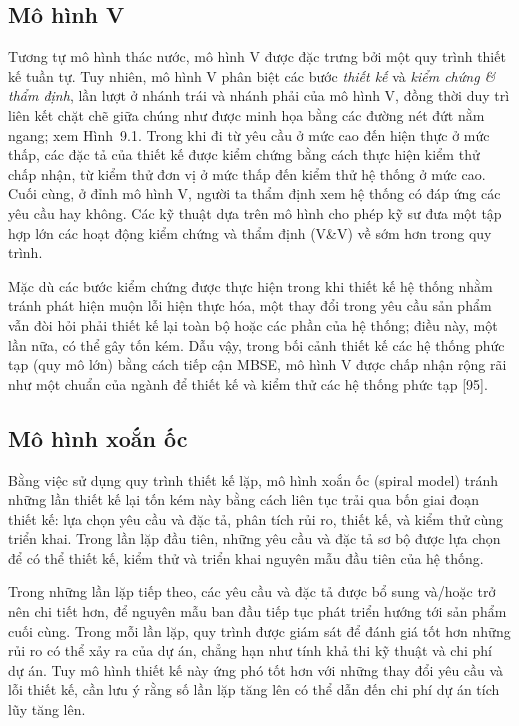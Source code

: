 \subsection{Mô hình V}
Tương tự mô hình thác nước, mô hình V được đặc trưng bởi một quy trình thiết kế tuần tự. Tuy nhiên, mô hình V phân biệt các bước \emph{thiết kế} và \emph{kiểm chứng \& thẩm định}, lần lượt ở nhánh trái và nhánh phải của mô hình V, đồng thời duy trì liên kết chặt chẽ giữa chúng như được minh họa bằng các đường nét đứt nằm ngang; xem Hình~9.1. Trong khi đi từ yêu cầu ở mức cao đến hiện thực ở mức thấp, các đặc tả của thiết kế được kiểm chứng bằng cách thực hiện kiểm thử chấp nhận, từ kiểm thử đơn vị ở mức thấp đến kiểm thử hệ thống ở mức cao. Cuối cùng, ở đỉnh mô hình V, người ta thẩm định xem hệ thống có đáp ứng các yêu cầu hay không. Các kỹ thuật dựa trên mô hình cho phép kỹ sư đưa một tập hợp lớn các hoạt động kiểm chứng và thẩm định (V\&V) về sớm hơn trong quy trình.

Mặc dù các bước kiểm chứng được thực hiện trong khi thiết kế hệ thống nhằm tránh phát hiện muộn lỗi hiện thực hóa, một thay đổi trong yêu cầu sản phẩm vẫn đòi hỏi phải thiết kế lại toàn bộ hoặc các phần của hệ thống; điều này, một lần nữa, có thể gây tốn kém. Dẫu vậy, trong bối cảnh thiết kế các hệ thống phức tạp (quy mô lớn) bằng cách tiếp cận MBSE, mô hình V được chấp nhận rộng rãi như một chuẩn của ngành để thiết kế và kiểm thử các hệ thống phức tạp [95].

\subsection{Mô hình xoắn ốc}
Bằng việc sử dụng quy trình thiết kế lặp, mô hình xoắn ốc (spiral model) tránh những lần thiết kế lại tốn kém này bằng cách liên tục trải qua bốn giai đoạn thiết kế: lựa chọn yêu cầu và đặc tả, phân tích rủi ro, thiết kế, và kiểm thử cùng triển khai. Trong lần lặp đầu tiên, những yêu cầu và đặc tả sơ bộ được lựa chọn để có thể thiết kế, kiểm thử và triển khai nguyên mẫu đầu tiên của hệ thống.

Trong những lần lặp tiếp theo, các yêu cầu và đặc tả được bổ sung và/hoặc trở nên chi tiết hơn, để nguyên mẫu ban đầu tiếp tục phát triển hướng tới sản phẩm cuối cùng. Trong mỗi lần lặp, quy trình được giám sát để đánh giá tốt hơn những rủi ro có thể xảy ra của dự án, chẳng hạn như tính khả thi kỹ thuật và chi phí dự án. Tuy mô hình thiết kế này ứng phó tốt hơn với những thay đổi yêu cầu và lỗi thiết kế, cần lưu ý rằng số lần lặp tăng lên có thể dẫn đến chi phí dự án tích lũy tăng lên.

